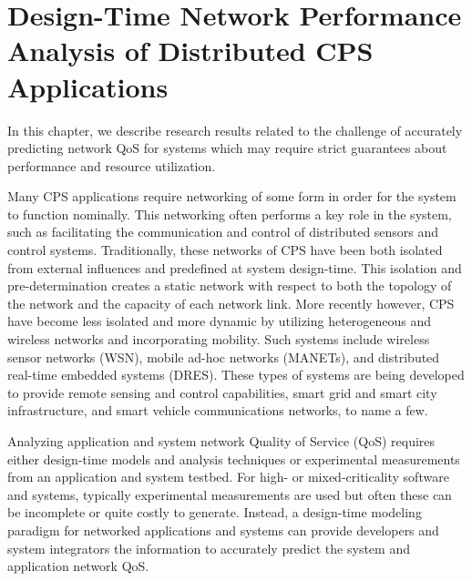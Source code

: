 \chapter{Design-Time Network Performance Analysis of Distributed CPS Applications}
\label{ch:designTime}

In this chapter, we describe research results related to the
challenge of accurately predicting network QoS for systems which may
require strict guarantees about performance and resource utilization.

Many CPS applications require networking of some form in order for the
system to function nominally.  This networking often performs a key
role in the system, such as facilitating the communication and control
of distributed sensors and control systems.  Traditionally, these
networks of CPS have been both isolated from external influences and
predefined at system design-time.  This isolation and
pre-determination creates a static network with respect to both the
topology of the network and the capacity of each network link.  More
recently however, CPS have become less isolated and more dynamic by
utilizing heterogeneous and wireless networks and incorporating
mobility.  Such systems include wireless sensor networks (WSN), mobile
ad-hoc networks (MANETs), and distributed real-time embedded systems
(DRES).  These types of systems are being developed to provide remote
sensing and control capabilities, smart grid and smart city
infrastructure, and smart vehicle communications networks, to name a
few.

Analyzing application and system network Quality of Service (QoS)
requires either design-time models and analysis techniques or
experimental measurements from an application and system testbed.  For
high- or mixed-criticality software and systems, typically
experimental measurements are used but often these can be incomplete
or quite costly to generate.  Instead, a design-time modeling paradigm
for networked applications and systems can provide developers and
system integrators the information to accurately predict the system
and application network QoS.

